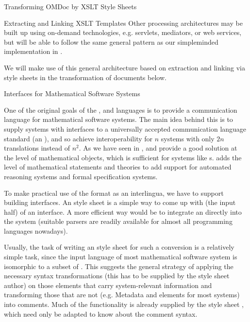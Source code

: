 \begin{tchapter}[id=transform-xsl,short=Transforming OMDoc]{Transforming OMDoc by XSLT Style Sheets}
\begin{tsection}[id=extract-link-xslt]{Extracting and Linking XSLT Templates}
Other processing architectures may be built up using
on-demand technologies, e.g. servlets, mediators, or web services, but will be
able to follow the same general pattern as our simpleminded implementation in
{}.

We will make use of this general architecture based on extraction and linking via
{\xslt} style sheets in the transformation of {\omdoc} documents below.


\end{tsection}

\begin{tsection}[id=omdoctosys,short=Interfaces for Systems]{{\omdoc} Interfaces for Mathematical Software Systems}

  One of the original goals of the {\openmath}, {\cmathml} and {\omdoc} languages is to
  provide a communication language for mathematical software systems. The main idea behind
  this is to supply systems with interfaces to a universally accepted communication
  language standard (an {}), and so achieve interoperability for $n$
  systems with only $2n$ translations instead of $n^2$. As we have seen in
  {}, {\openmath} and {\cmathml} provide a good solution at the
  level of mathematical objects, which is sufficient for systems like {s}. {\omdoc} adds the level of mathematical statements and theories
  to add support for automated reasoning systems and formal specification systems.

To make practical use of the {\omdoc} format as an interlingua, we have to support
building {\omdoc} interfaces. An {\xslt} style sheet is a simple way to come up with (the
input half) of an {\omdoc} interface.  A more efficient way would be to integrate an
{\xml} directly into the system (suitable {\xml} parsers are readily
available for almost all programming languages nowadays).

Usually, the task of writing an {\xslt} style sheet for such a conversion is a
relatively simple task, since the input language of most mathematical software
system is isomorphic to a subset of {\omdoc}. This suggests the general strategy
of applying the necessary syntax transformations (this has to be supplied by the
style sheet author) on those {\omdoc} elements that carry system-relevant
information and transforming those that are not (e.g. Metadata and {}
elements for most systems) into comments.  Much of the functionality is already
supplied by the style sheet {}, which need only be adapted to
know about the comment syntax. 


\end{tsection}
\end{tchapter}
